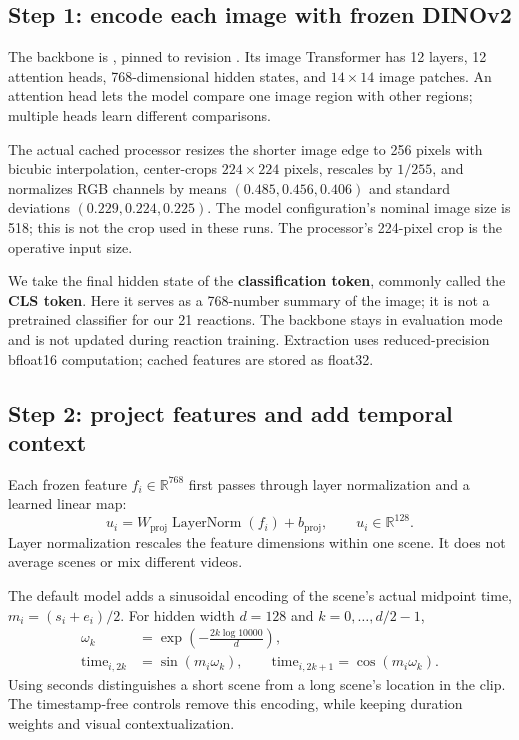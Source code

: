 \documentclass[11pt,a4paper]{article}
\newcommand{\LN}{\operatorname{LayerNorm}}
\begin{document}
\subsection{Step 1: encode each image with frozen DINOv2}
The backbone is , pinned to revision . Its image Transformer has 12 layers, 12 attention heads, 768-dimensional hidden states, and $14\times14$ image patches. An attention head lets the model compare one image region with other regions; multiple heads learn different comparisons.

The actual cached processor resizes the shorter image edge to 256 pixels with bicubic interpolation, center-crops $224\times224$ pixels, rescales by $1/255$, and normalizes RGB channels by means $(0.485,0.456,0.406)$ and standard deviations $(0.229,0.224,0.225)$. The model configuration's nominal image size is 518; this is not the crop used in these runs. The processor's 224-pixel crop is the operative input size.

We take the final hidden state of the \textbf{classification token}, commonly called the \textbf{CLS token}. Here it serves as a 768-number summary of the image; it is not a pretrained classifier for our 21 reactions. The backbone stays in evaluation mode and is not updated during reaction training. Extraction uses reduced-precision bfloat16 computation; cached features are stored as float32.

\subsection{Step 2: project features and add temporal context}
Each frozen feature $f_i\in\mathbb{R}^{768}$ first passes through layer normalization and a learned linear map:
\begin{equation}
u_i=W_{\mathrm{proj}}\LN(f_i)+b_{\mathrm{proj}},\qquad u_i\in\mathbb{R}^{128}.
\end{equation}
Layer normalization rescales the feature dimensions within one scene. It does not average scenes or mix different videos.

The default model adds a sinusoidal encoding of the scene's actual midpoint time, $m_i=(s_i+e_i)/2$. For hidden width $d=128$ and $k=0,\ldots,d/2-1$,
\begin{align}
\omega_k&=\exp\!\left(-\frac{2k\log10000}{d}\right),\\
\mathrm{time}_{i,2k}&=\sin(m_i\omega_k),\qquad
\mathrm{time}_{i,2k+1}=\cos(m_i\omega_k).
\end{align}
Using seconds distinguishes a short scene from a long scene's location in the clip. The timestamp-free controls remove this encoding, while keeping duration weights and visual contextualization.
\end{document}
